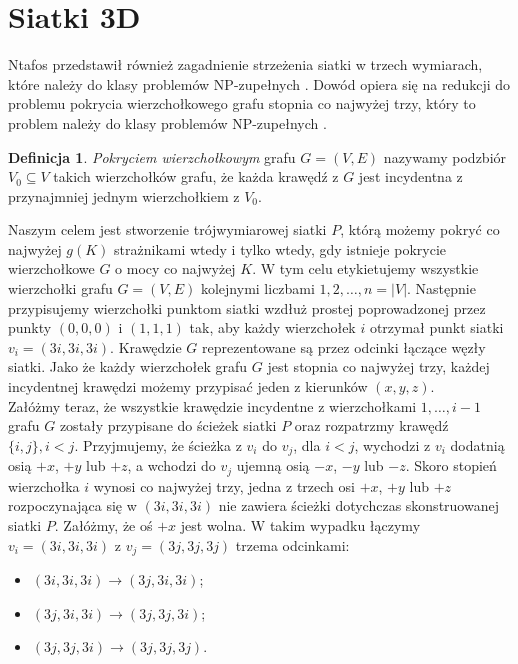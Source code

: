 \documentclass[brudnopis]{xmgr}
\theoremstyle{definition}
\newtheorem{Definicja}{Definicja}
\begin{document}
 \section{Siatki 3D}
 	Ntafos przedstawił również zagadnienie strzeżenia siatki w trzech wymiarach, które należy do klasy problemów NP-zupełnych \cite{ntafos}. Dowód opiera się na redukcji do problemu pokrycia wierzchołkowego grafu stopnia co najwyżej trzy, który to problem należy do klasy problemów NP-zupełnych \cite{garey}.
\begin{Definicja}
	\emph{Pokryciem wierzchołkowym} grafu $G = (V,E)$ nazywamy podzbiór $V_0 \subseteq V$ takich wierzchołków grafu, że każda krawędź z $G$ jest incydentna z przynajmniej jednym wierzchołkiem z $V_0$.
\end{Definicja}
Naszym celem jest stworzenie trójwymiarowej siatki $P$, którą możemy pokryć co najwyżej $g(K)$ strażnikami wtedy i tylko wtedy, gdy istnieje pokrycie wierzchołkowe $G$ o mocy co najwyżej $K$.
W tym celu etykietujemy wszystkie wierzchołki grafu $G = (V,E)$ kolejnymi liczbami $1,2,\ldots,n = |V|$. Następnie przypisujemy wierzchołki punktom siatki wzdłuż prostej poprowadzonej przez punkty $(0,0,0)$ i $(1,1,1)$ tak, aby każdy wierzchołek $i$ otrzymał punkt siatki $v_i = (3i, 3i, 3i)$. Krawędzie $G$ reprezentowane są przez odcinki łączące węzły siatki. Jako że każdy wierzchołek grafu $G$ jest stopnia co najwyżej trzy, każdej incydentnej krawędzi możemy przypisać jeden z kierunków $(x,y,z)$.
\\\indent Załóżmy teraz, że wszystkie krawędzie incydentne z wierzchołkami \linebreak $1,\ldots,i - 1$ grafu $G$ zostały przypisane do ścieżek siatki $P$ oraz rozpatrzmy krawędź $\{i,j\}, i < j$. Przyjmujemy, że ścieżka z $v_i$ do $v_j$, dla $i < j$, wychodzi z $v_i$ dodatnią osią $+x$, $+y$ lub $+z$, a wchodzi do $v_j$ ujemną osią $-x$, $-y$ lub $-z$. Skoro stopień wierzchołka $i$ wynosi co najwyżej trzy, jedna z trzech osi $+x$, $+y$ lub $+z$ rozpoczynająca się w $(3i, 3i, 3i)$ nie zawiera ścieżki dotychczas skonstruowanej siatki $P$. Załóżmy, że oś $+x$ jest wolna. W takim wypadku łączymy $v_i = (3i, 3i, 3i)$ z $v_j = (3j, 3j, 3j)$ trzema odcinkami:
\begin{itemize}
	\item $(3i, 3i, 3i) \rightarrow (3j, 3i, 3i)$;
	\item $(3j, 3i, 3i) \rightarrow (3j, 3j, 3i)$;
	\item $(3j, 3j, 3i) \rightarrow (3j, 3j, 3j)$.
\end{itemize}
\end{document}
